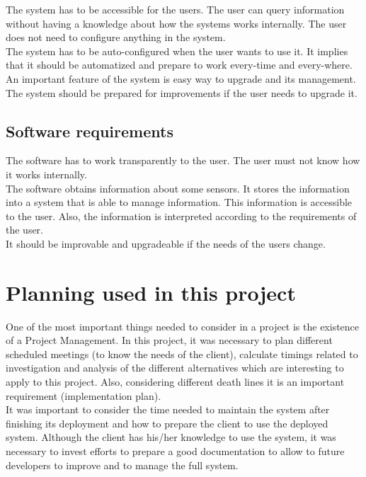 The system has to be accessible for the users. The user can query information without having a knowledge about how the systems works internally. The user does not need to configure anything in the system.\\

The system has to be auto-configured when the user wants to use it. It implies that it should be automatized and prepare to work every-time and every-where.\\

An important feature of the system is easy way to upgrade and its management. The system should be prepared for improvements if the user needs to upgrade it.

\subsection{Software requirements}

The software has to work transparently to the user. The user must not know how it works internally.\\

The software obtains information about some sensors. It stores the information into a system that is able to manage information. This information is accessible to the user. Also, the information is interpreted according to the requirements of the user.\\

It should be improvable and upgradeable if the needs of the users change.

\section{Planning used in this project}

One of the most important things needed to consider in a project is the existence of a Project Management. In this project, it was necessary to plan different scheduled meetings (to know the needs of the client), calculate timings related to investigation and analysis of the different alternatives which are interesting to apply to this project. Also, considering different death lines it is an important requirement (implementation plan).\\

It was important to consider the time needed to maintain the system after finishing its deployment and how to prepare the client to use the deployed system. Although the client has his/her knowledge to use the system, it was necessary to invest  efforts to prepare a good documentation to allow to future developers to improve and to manage the full system.\\

